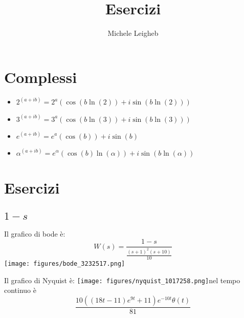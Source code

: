 \documentclass{article}
\title{Esercizi}
\author{Michele Leigheb}
\date{}
\begin{document}
\maketitle
\tableofcontents{}
\section{Complessi}
\begin{itemize}
	\item \(\displaystyle 2^{(a+ib)} = 2^a (\cos(b \ln(2)) + i\sin(b \ln(2))) \)
	\item \(\displaystyle 3^{(a+ib)} = 3^a (\cos(b \ln(3)) + i\sin(b \ln(3))) \)
	\item \(\displaystyle e^{(a+ib)} = e^a (\cos(b)) + i\sin(b) \)
	\item \(\displaystyle \alpha^{(a+ib)} = e^{\alpha} (\cos(b)\ln(\alpha)) + i\sin(b\ln(\alpha)) \)
\end{itemize}



\section{Esercizi}

\subsection{$ 1 - s $}
Il grafico di bode è:
\[ W(s) = \frac{1 - s}{\frac{\left(s + 1\right)^{2} \left(s + 10\right)}{10}} \]\texttt{[image: figures/bode\_3232517.png]}


Il grafico di Nyquist è:
\texttt{[image: figures/nyquist\_1017258.png]}nel tempo continuo è \[ \frac{10 \left(\left(18 t - 11\right) e^{9 t} + 11\right) e^{- 10 t} \theta\left(t\right)}{81} \]
\end{document}
